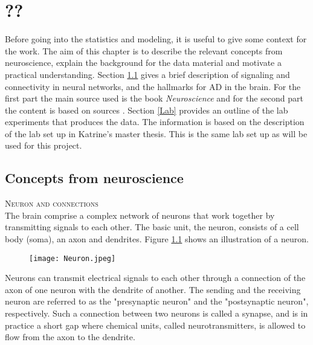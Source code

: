
\chapter{??}

Before going into the statistics and modeling, it is useful to give some context for the work. The aim of this chapter is to describe the relevant concepts from neuroscience, explain the background for the data material and motivate a practical understanding. Section \ref{structure_nn} gives a brief description of signaling and connectivity in neural networks, and the hallmarks for AD in the brain. For the first part the main source used is the book \textit{Neuroscience} \cite{Purves} and for the second part the content is based on sources \cite{Gomez,Witter:2011}. Section \ref{Lab} provides an outline of the lab experiments that produces the data. The information is based on the description of the lab set up in Katrine's master thesis. This is the same lab set up as will be used for this project. 



\section{Concepts from neuroscience}
\label{structure_nn}

\textsc{Neuron and connections}\\
The brain comprise a complex network of neurons that work together by transmitting signals to each other. The basic unit, the neuron, 
 consists of a cell body (soma), an axon and dendrites. Figure \ref{neuron} shows an illustration of a neuron.
\begin{figure}[h]
    \caption{}
    \label{neuron}
    \centering
    \texttt{[image: Neuron.jpeg]}
\end{figure} 

Neurons can transmit electrical signals to each other through a connection of the axon of one neuron with the dendrite of another. The sending and the receiving neuron are referred to as the "presynaptic neuron" and the "postsynaptic neuron", respectively. Such a connection between two neurons is called a synapse, and is in practice a short gap where chemical units, called neurotransmitters, is allowed to flow from the axon to the dendrite. 

